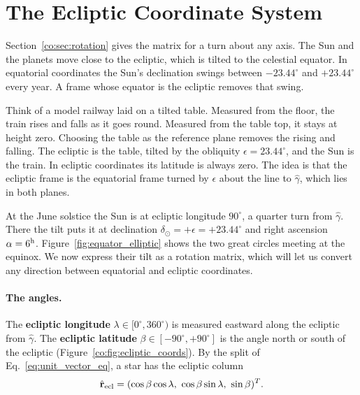 \section{The Ecliptic Coordinate System}
\label{co:sec:ecliptic}

Section~\ref{co:sec:rotation} gives the matrix for a turn about any axis. The Sun and the planets move close to the ecliptic, which is tilted to the celestial equator. In equatorial coordinates the Sun's declination swings between $-23.44^\circ$ and $+23.44^\circ$ every year. A frame whose equator is the ecliptic removes that swing.

Think of a model railway laid on a tilted table. Measured from the floor, the train rises and falls as it goes round. Measured from the table top, it stays at height zero. Choosing the table as the reference plane removes the rising and falling. The ecliptic is the table, tilted by the obliquity $\epsilon=23.44^\circ$, and the Sun is the train. In ecliptic coordinates its latitude is always zero. The idea is that the ecliptic frame is the equatorial frame turned by $\epsilon$ about the line to $\hat\gamma$, which lies in both planes.

At the June solstice the Sun is at ecliptic longitude $90^\circ$, a quarter turn from $\hat\gamma$. There the tilt puts it at declination $\delta_\odot=+\epsilon=+23.44^\circ$ and right ascension $\alpha=6^{\rm h}$. Figure~\ref{fig:equator_elliptic} shows the two great circles meeting at the equinox. We now express their tilt as a rotation matrix, which will let us convert any direction between equatorial and ecliptic coordinates.

\paragraph{The angles.} The \textbf{ecliptic longitude} $\lambda\in[0^\circ,360^\circ)$ is measured eastward along the ecliptic from $\hat\gamma$. The \textbf{ecliptic latitude} $\beta\in[-90^\circ,+90^\circ]$ is the angle north or south of the ecliptic (Figure~\ref{co:fig:ecliptic_coords}). By the split of Eq.~\eqref{eq:unit_vector_eq}, a star has the ecliptic column
\[
\hat{\mathbf r}_{\rm ecl}=(\cos\beta\cos\lambda,\ \cos\beta\sin\lambda,\ \sin\beta)^{T}.
\]

